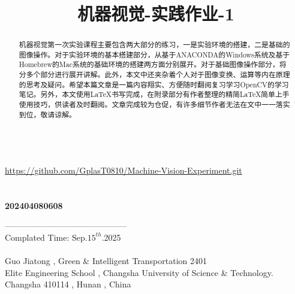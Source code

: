 \documentclass[11pt]{article}
\title{机器视觉-实践作业-1}
\let\Oldlatex\LaTeX
\renewcommand{\LaTeX}{\textrm{\Oldlatex}}
\begin{document}
    
    \maketitle
    \vspace*{4em}
    \begin{abstract}
    	机器视觉第一次实验课程主要包含两大部分的练习，一是实验环境的搭建，二是基础的图像操作。对于实验环境的基本搭建部分，从基于ANACONDA的Windows系统及基于Homebrew的Mac系统的基础环境的搭建两方面分别展开。对于基础图像操作部分，将分多个部分进行展开讲解。此外，本文中还夹杂着个人对于图像变换、运算等内在原理的思考及疑问。希望本篇文章是一篇内容翔实、方便随时翻阅复习学习OpenCV的学习笔记。另外，本文使用\LaTeX 书写完成，在附录部分有作者整理的精简\LaTeX 简单上手使用技巧，供读者及时翻阅。文章完成较为仓促，有许多细节作者无法在文中一一落实到位，敬请谅解。
    \end{abstract}
        
    \begin{center}
    	\\\underline{https://github.com/GplasT0810/Machine-Vision-Experiment.git}\\
    	\\
    	\\
    	\vspace{0.7em}\textbf{{\large 202404080608}}\\
    \end{center}
    \newpage

    \tableofcontents
    \begin{center}
    	\vspace{17em}
    \end{center}
    
    \vspace*{22em}--------------------------------------------\\
    Complated Time: Sep.$15^{th}$.2025\\ \\
    Guo Jiatong , Green \& Intelligent Transportation 2401\\
    Elite Engineering School , Changsha University of Science \& Technology.\\
    Changsha 410114 , Hunan , China
    
\end{document}
